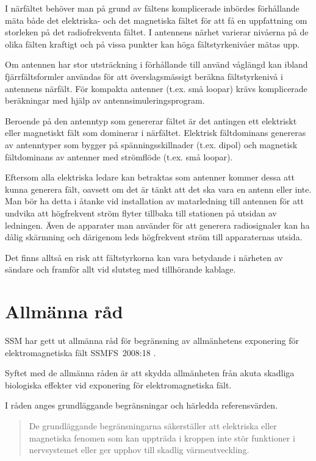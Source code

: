 I närfältet behöver man på grund av fältens komplicerade inbördes förhållande
mäta både det elektriska- och det magnetiska fältet för att få en uppfattning
om storleken på det radiofrekventa fältet.
I antennens närhet varierar nivåerna på de olika fälten kraftigt och på vissa
punkter kan höga fältstyrkenivåer mätas upp.

Om antennen har stor utsträckning i förhållande till använd våglängd kan ibland
fjärrfältsformler användas för att överslagsmässigt beräkna fältstyrkenivå i
antennens närfält.
För kompakta antenner (t.ex. små loopar) krävs komplicerade beräkningar
med hjälp av antennsimuleringsprogram.

Beroende på den antenntyp som genererar fältet är det antingen ett elektriskt
eller magnetiskt fält som dominerar i närfältet.
Elektrisk fältdominans genereras av antenntyper som bygger på
spänningsskillnader (t.ex. dipol) och magnetisk fältdominans av antenner
med strömflöde (t.ex. små loopar).

Eftersom alla elektriska ledare kan betraktas som antenner kommer dessa att
kunna generera fält, oavsett om det är tänkt att det ska vara en antenn eller
inte.
Man bör ha detta i åtanke vid installation av matarledning till antennen för
att undvika att högfrekvent ström flyter tillbaka till stationen på utsidan av
ledningen.
Även de apparater man använder för att generera radiosignaler kan ha dålig
skärmning och därigenom leds högfrekvent ström till apparaternas utsida.

Det finns alltså en risk att fältstyrkorna kan vara betydande i närheten av
sändare och framför allt vid slutsteg med tillhörande kablage.

\section{Allmänna råd}

SSM har gett ut allmänna råd för begränsning av allmänhetens exponering
för elektromagnetiska fält SSMFS~2008:18 \cite{SSMFS2008:18}.

Syftet med de allmänna råden är att skydda allmänheten från akuta
skadliga biologiska effekter vid exponering för elektromagnetiska fält.

I råden anges grundläggande begränsningar och härledda referensvärden.

\begin{quote}
	De grundläggande begränsningarna säkerställer att elektriska eller
	magnetiska fenomen som kan uppträda i kroppen inte stör funktioner i
	nervsystemet eller ger upphov till skadlig värmeutveckling.
\end{quote}

